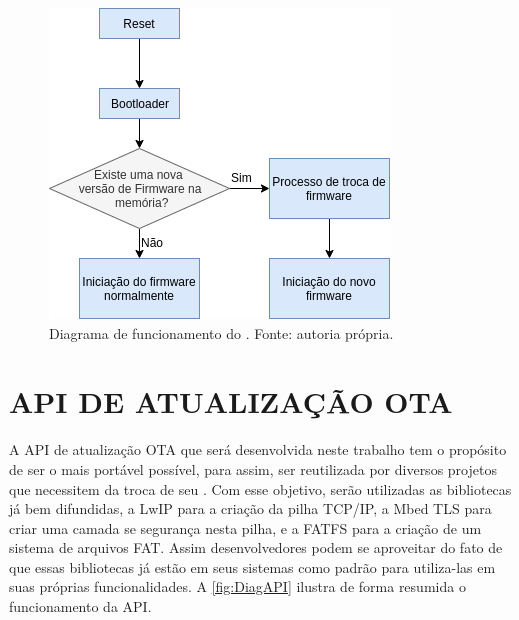 \begin{figure}[H]
    \scriptsize
     \centering
     \includegraphics[scale=0.9]{dados/figuras/BootloaderDiag.png}
     \caption{Diagrama de funcionamento do \bootloader. \newline Fonte: autoria própria.}
     \label{fig:DiagBootloader}
\end{figure}



\section{API DE ATUALIZAÇÃO OTA}
\label{sec:API}

A API de atualização OTA que será desenvolvida neste trabalho tem o propósito de ser o mais portável possível, para assim, ser reutilizada por diversos projetos que necessitem da troca de seu \software. Com esse objetivo, serão utilizadas as bibliotecas já bem difundidas, a LwIP para a criação da pilha TCP/IP, a Mbed TLS para criar uma camada se segurança nesta pilha, e a FATFS para a criação de um sistema de arquivos FAT. Assim desenvolvedores podem se aproveitar do fato de que essas bibliotecas já estão em seus sistemas como padrão para utiliza-las em suas próprias funcionalidades. A \autoref{fig:DiagAPI} ilustra de forma resumida o funcionamento da API.

